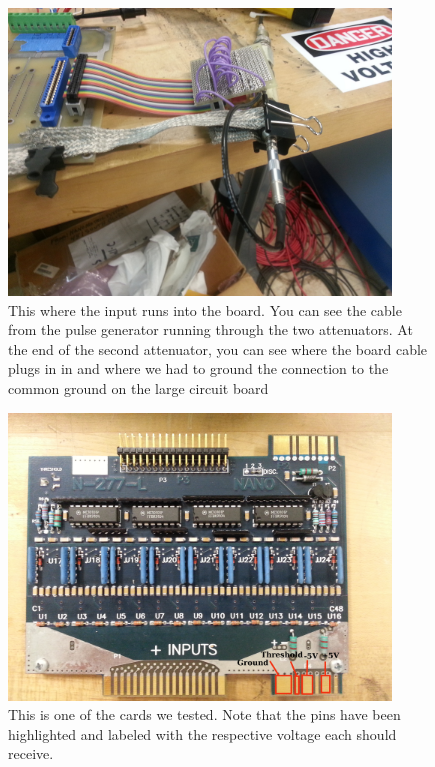 \documentclass[final]{report}
\begin{document}
\begin{figure}[11]
  \centering
  \includegraphics[height=3in]{Figure11.jpg}
  \caption{This where the input runs into the board. You can see the cable from the pulse generator running through the two attenuators. At the end of the second attenuator, you can see where the board cable plugs in in and where we had to ground the connection to the common ground on the large circuit board}
  \label{fig:input}
\end{figure}
\begin{figure}[12]
  \centering
  \includegraphics[height=3in]{Figure12.jpg}
  \caption{This is one of the cards we tested. Note that the pins have been highlighted and labeled with the respective voltage each should receive.}
  \label{fig:card}
\end{figure}
\end{document}
